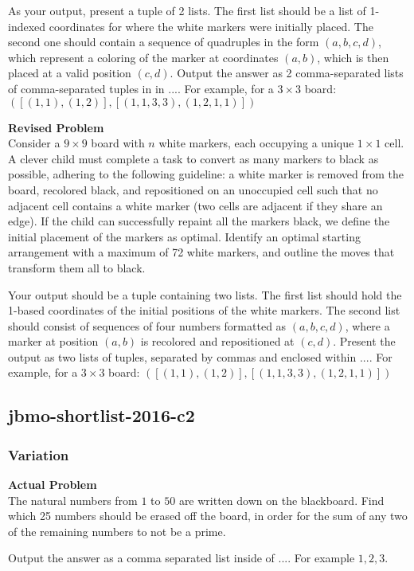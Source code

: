 As your output, present a tuple of 2 lists. The first list should be a list of 1-indexed coordinates for where the white markers were initially placed. The second one should contain a sequence of quadruples in the form $(a,b,c,d)$, which represent a coloring of the marker at coordinates $(a,b)$, which is then placed at a valid position $(c,d)$. Output the answer as 2 comma-separated lists of comma-separated tuples in in $\boxed{...}$. For example, for a $3\times 3$ board: $\boxed{([(1, 1), (1,2)], [(1,1,3,3), (1,2,1,1)])}$

\textbf{Revised Problem}\\
Consider a $9 \times 9$ board with $n$ white markers, each occupying a unique $1 \times 1$ cell. A clever child must complete a task to convert as many markers to black as possible, adhering to the following guideline: a white marker is removed from the board, recolored black, and repositioned on an unoccupied cell such that no adjacent cell contains a white marker (two cells are adjacent if they share an edge). If the child can successfully repaint all the markers black, we define the initial placement of the markers as optimal. Identify an optimal starting arrangement with a maximum of 72 white markers, and outline the moves that transform them all to black.

Your output should be a tuple containing two lists. The first list should hold the 1-based coordinates of the initial positions of the white markers. The second list should consist of sequences of four numbers formatted as $(a,b,c,d)$, where a marker at position $(a,b)$ is recolored and repositioned at $(c,d)$. Present the output as two lists of tuples, separated by commas and enclosed within $\boxed{...}$. For example, for a $3\times 3$ board: $\boxed{([(1, 1), (1,2)], [(1,1,3,3), (1,2,1,1)])}$

\subsection{jbmo-shortlist-2016-c2}
\subsubsection{Variation}
\textbf{Actual Problem}\\
The natural numbers from $1$ to $50$ are written down on the blackboard. Find which 25 numbers should be erased off the board, in order for the sum of any two of the remaining numbers to not be a prime.

Output the answer as a comma separated list inside of $\boxed{...}$. For example $\boxed{1, 2, 3}$.

